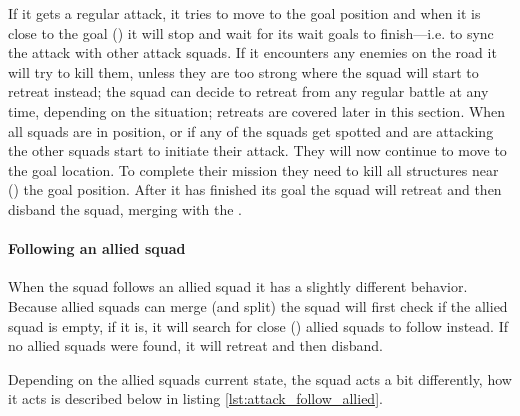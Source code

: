 If it gets a regular attack, it tries to move to the goal position and when it is close to the goal (\squadAttackWaitingPositionDistanceFromGoal) it will stop and wait for its wait goals to finish—i.e. to sync the attack with other attack squads. If it encounters any enemies on the road it will try to kill them, unless they are too strong where the squad will start to retreat instead; the squad can decide to retreat from any regular battle at any time, depending on the situation; retreats are covered later in this section. When all squads are in position, or if any of the squads get spotted and are attacking the other squads start to initiate their attack. They will now continue to move to the goal location. To complete their mission they need to kill all structures near (\squadAttackStructuresDestroyedGoalDistance) the goal position. After it has finished its goal the squad will retreat and then disband the squad, merging with the .

\paragraph{Following an allied squad}
When the squad follows an allied squad it has a slightly different behavior. Because allied squads can merge (and split) the squad will first check if the allied squad is empty, if it is, it will search for close (\squadAttackFindAlliedSquadDistance) allied squads to follow instead. If no allied squads were found, it will retreat and then disband.

Depending on the allied squads current state, the squad acts a bit differently, how it acts is described below in listing \ref{lst:attack_follow_allied}.

